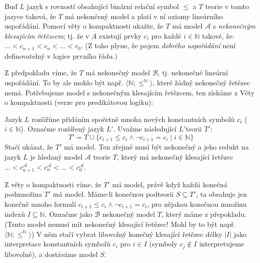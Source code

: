 \begin{problem} 
    
    Buď $L$ jazyk s rovností obsahující binární relační symbol $\le$ a $T$ teorie v tomto jazyce taková, že $T$ má nekončený model a platí v ní axiomy lineárního uspořádání. Pomocí věty o kompaktnosti ukažte, že $T$ má model $\mathcal{A}$ s \emph{nekonečným klesajícím řetězcem}; tj. že v $A$ existují prvky $c_i$ pro každé $i\in \mathbb{N}$ takové, že: $\dots < c_{n+1} < c_n< \dots <c_0$.
    (Z toho plyne, že pojem \emph{dobrého uspořádání} není definovatelný v logice prvního řádu.)

    \begin{solution}

        Z předpokladu víme, že $T$ má nekonečný model $\mathcal B$, tj. nekonečné lineární uspořádání. To by ale mohlo být např. $\langle \mathbb N;\leq^\mathbb N\rangle$, které žádný nekonečný řetězec nemá. Potřebujeme model s nekonečným klesajícím řetězcem, ten získáme z Věty o kompaktnosti (verze pro predikátovou logiku):
                
        Jazyk $L$ rozšíříme přidáním spočetně mnoha nových konstantních symbolů $c_i$ ($i\in\mathbb{N}$). Označme rozšířený jazyk $L'$. Uvažme následující $L'$teorii $T'$:
        $$
        T' = T \cup \{c_{i+1}\leq c_i\land\neg c_{i+1}=c_i\mid i\in\mathbb{N}\}
        $$
        Stačí ukázat, že $T'$ má model. Ten zřejmě musí být nekonečný a jeho redukt na jazyk $L$ je hledaný model $\mathcal A$ teorie $T$, který má nekonečný klesající řetězec $\dots < c_{n+1}^\mathcal A < c_n^\mathcal A < \dots < c_0^\mathcal A$. 
        
        Z věty o kompaktnosti víme, že $T'$ má model, právě když každá konečná podmnožina $T'$ má model. Máme-li konečnou podteorii $S\subseteq T'$, ta obsahuje jen konečně mnoho formulí $c_{i+1}\leq c_i\land\neg c_{i+1}=c_i$, pro nějakou konečnou množinu indexů $I\subseteq\mathbb N$. Označme jako $\mathcal B$  nekonečný model $T$, který máme z přepokladu. (Tento model nemusí mít nekonečný klesající řetězec! Mohl by to být např. $\langle \mathbb N;\leq^\mathbb N\rangle$) V něm stačí vybrat libovolný konečný klesající řetězec délky $|I|$ jako interpretace konstantních symbolů $c_i$ pro $i\in I$ (symboly $c_j\notin I$ interpretujeme libovolně), a dostáváme model $S$.
                    
    \end{solution}

\end{problem}




